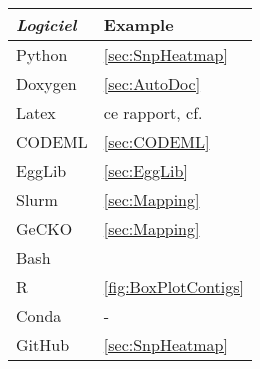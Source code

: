\documentclass[../main]{subfiles} %
\begin{document}
\addto\extrasfrench{\protected\edef:{\unexpanded\expandafter{:}}}

\begin{table}[ht]
    \centering
    \begin{tabular}{l l}
        \toprule
        \textit{Logiciel} & Example \\
        \midrule
        \gls{Python} & \cref{sec:SnpHeatmap} \\
        \gls{Doxygen} & \cref{sec:AutoDoc} \\
        \gls{Latex} & ce rapport, cf. \cite{florent_f-marchalm1bioinfointernship2024-inrae_agap_ge2pop_2024} \\
        \gls{CODEML} & \cref{sec:CODEML} \\
        \gls{EggLib} & \cref{sec:EggLib} \\
        \gls{Slurm} & \cref{sec:Mapping} \\
        \gls{GeCKO} & \cref{sec:Mapping} \\
        \gls{Bash} & \cite{florent_f-marchalm1bioinfointernship2024-inrae_agap_ge2pop_2024} \\
        \gls{R} & \cref{fig:BoxPlotContigs} \\
        \gls{Conda} & - \\
        \gls{GitHub} & \cref{sec:SnpHeatmap} \\
 


\end{tabular}
\end{table}
\end{document}
